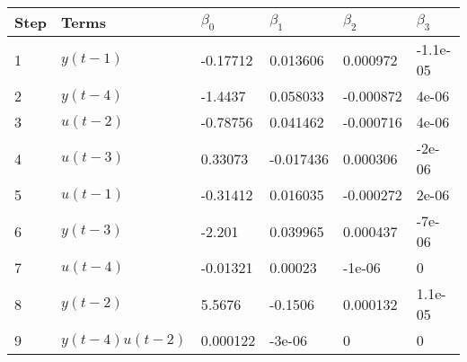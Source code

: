 \begin{tabular}{llllll}
Step & Terms & $\beta_{0}$ & $\beta_{1}$ & $\beta_{2}$ & $\beta_{3}$ \\ 
\hline 
1 & $y(t-1)$ & -0.17712 & 0.013606 & 0.000972 & -1.1e-05 \\ 
2 & $y(t-4)$ & -1.4437 & 0.058033 & -0.000872 & 4e-06 \\ 
3 & $u(t-2)$ & -0.78756 & 0.041462 & -0.000716 & 4e-06 \\ 
4 & $u(t-3)$ & 0.33073 & -0.017436 & 0.000306 & -2e-06 \\ 
5 & $u(t-1)$ & -0.31412 & 0.016035 & -0.000272 & 2e-06 \\ 
6 & $y(t-3)$ & -2.201 & 0.039965 & 0.000437 & -7e-06 \\ 
7 & $u(t-4)$ & -0.01321 & 0.00023 & -1e-06 & 0 \\ 
8 & $y(t-2)$ & 5.5676 & -0.1506 & 0.000132 & 1.1e-05 \\ 
9 & $y(t-4)u(t-2)$ & 0.000122 & -3e-06 & 0 & 0 \\ 
\hline 
\end{tabular}